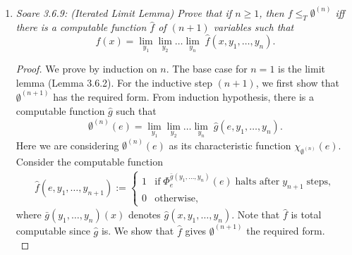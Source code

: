\documentclass{article}
\begin{document}
\begin{enumerate}[label={\bf Q\arabic*:}]
    \begin{proof}
      Assume such a partial computable function $f$ exists. By the SMN
      theorem, there is a total recursive function $g(e)$ such that
      \begin{align*}
        \varphi_{g(e)}(s) :=
        \begin{cases}
          0, &\text{if}\; \varphi_{e}(e)\; \text{has not halted after}\;
            s\; \text{steps}\\
          1, &\text{otherwise}.
        \end{cases}
      \end{align*}

      Then if $e\in K$ halts, $\varphi_{g(e)}$ will be the characteristic
      function of the finite set $\{1\}$, otherwise $\varphi_{g(e)}$ will
      be the characteristic function of the empty set. Thus $e\in K$ if and
      only if $f(g(e))$ is the index corresponding to the finite set
      $\{1\}$, which contradicts the incomputability of $K$.
    \end{proof}

  \item \it Soare 3.6.9: (Iterated Limit Lemma) Prove that if $n\geq1$,
    then $f\leq_T\emptyset^{(n)}$ iff there is a computable function
    $\hat{f}$ of $(n+1)$ variables such that
    \[f(x) =\lim_{y_1} \lim_{y_2} \ldots \lim_{y_n}\;
    \hat{f}(x,y_1,\ldots,y_n).\]

    \begin{proof}
      We prove by induction on $n$. The base case for $n=1$ is the limit
      lemma (Lemma 3.6.2). For the inductive step $(n+1)$, we first show
      that $\emptyset^{(n+1)}$ has the required form. From induction
      hypothesis, there is a computable function $\hat{g}$ such that
      \[\emptyset^{(n)}(e) =\lim_{y_1} \lim_{y_2} \ldots \lim_{y_{n}}\;
      \hat{g}(e,y_1,\ldots,y_n).\]
      Here we are considering $\emptyset^{(n)}(e)$ as its characteristic
      function $\chi_{\emptyset^{(n)}}(e)$. Consider the computable
      function
      \begin{align*}
        \hat{f}(e,y_1,\ldots,y_{n+1}) :=
        \begin{cases}
          1 &\text{if}\; \Phi_e^{\bar{g}(y_1,\ldots,y_n)}(e)\; \text{halts
            after}\; y_{n+1}\; \text{steps},\\
          0 &\text{otherwise},
        \end{cases}
      \end{align*}
      where $\bar{g}(y_1,\ldots,y_n)(x)$ denotes
      $\hat{g}(x,y_1,\ldots,y_n)$. Note that $\hat{f}$ is total computable
      since $\hat{g}$ is. We show that $\hat{f}$ gives $\emptyset^{(n+1)}$
      the required form. \\


\end{proof}
\end{enumerate}
\end{document}
